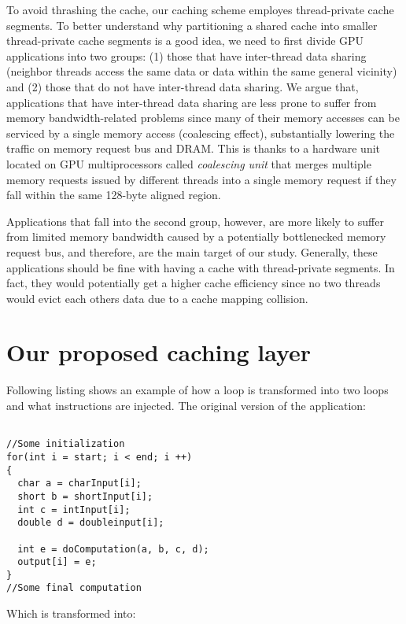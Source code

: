 To avoid thrashing the cache, our caching scheme employes thread-private cache segments. To better understand why
partitioning a shared cache into smaller thread-private cache segments is a good idea, we need to first divide GPU
applications into two groups: (1) those that have inter-thread data sharing (neighbor threads access the same data or
data within the same general vicinity) and (2) those that do not have inter-thread data sharing. We argue that,
applications that have inter-thread data sharing are less prone to suffer from memory bandwidth-related problems since
many of their memory accesses can be serviced by a single memory access (coalescing effect), substantially lowering the
traffic on memory request bus and DRAM. This is thanks to a hardware unit located on GPU multiprocessors called {\it
coalescing unit} that merges multiple memory requests issued by different threads into a single memory request if they
fall within the same 128-byte aligned region.

Applications that fall into the second group, however, are more likely to suffer from limited memory bandwidth caused by
a potentially bottlenecked memory request bus, and therefore, are the main target of our study. Generally, these
applications should be fine with having a cache with thread-private segments. In fact, they would potentially get a
higher cache efficiency since no two threads would evict each others data due to a cache mapping collision.


\section{Our proposed caching layer}



Following listing shows an example of how a loop is transformed into two loops and what instructions are injected. 
The original version of the application:

{\footnotesize

\begin{verbatim}

//Some initialization
for(int i = start; i < end; i ++)
{
  char a = charInput[i];
  short b = shortInput[i];
  int c = intInput[i];
  double d = doubleinput[i];

  int e = doComputation(a, b, c, d);
  output[i] = e;
}
//Some final computation
\end{verbatim}
}

Which is transformed into:

